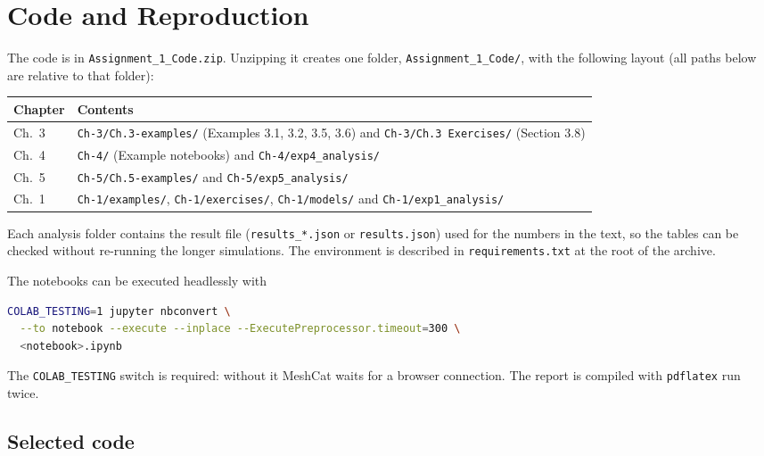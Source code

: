 \documentclass[11pt]{report}
\begin{document}
\appendix
\chapter{Code and Reproduction}
\label{app:code}

The code is in \texttt{Assignment\_1\_Code.zip}.  Unzipping it creates one
folder, \texttt{Assignment\_1\_Code/}, with the following layout (all paths
below are relative to that folder):

\begin{center}
\small
\begin{tabular}{>{\raggedright\arraybackslash}p{}>{\raggedright\arraybackslash}p{}}
\toprule
Chapter & Contents \\
\midrule
Ch.~3 & \texttt{Ch-3/Ch.3-examples/} (Examples 3.1, 3.2, 3.5, 3.6) and
        \texttt{Ch-3/Ch.3 Exercises/} (Section 3.8) \\
Ch.~4 & \texttt{Ch-4/} (Example notebooks) and \texttt{Ch-4/exp4\_analysis/} \\
Ch.~5 & \texttt{Ch-5/Ch.5-examples/} and \texttt{Ch-5/exp5\_analysis/} \\
Ch.~1 & \texttt{Ch-1/examples/}, \texttt{Ch-1/exercises/},
        \texttt{Ch-1/models/} and \texttt{Ch-1/exp1\_analysis/} \\
\bottomrule
\end{tabular}
\end{center}

Each analysis folder contains the result file (\texttt{results\_*.json} or
\texttt{results.json}) used for the numbers in the text, so the tables can be
checked without re-running the longer simulations.  The environment is
described in \texttt{requirements.txt} at the root of the archive.

The notebooks can be executed headlessly with
\begin{lstlisting}[language=bash]
COLAB_TESTING=1 jupyter nbconvert \
  --to notebook --execute --inplace --ExecutePreprocessor.timeout=300 \
  <notebook>.ipynb
\end{lstlisting}
\begin{sloppypar}
The \texttt{COLAB\_TESTING} switch is required: without it MeshCat waits for a
browser connection.  The report is compiled with \texttt{pdflatex} run twice.
\end{sloppypar}

\section{Selected code}
\end{document}
